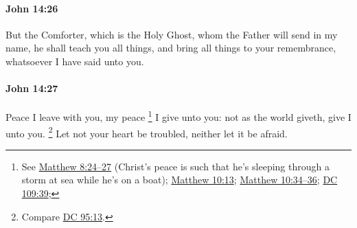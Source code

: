		\paragraph{John 14:26} %
			\label{JOHN-14-26}

			But the Comforter, which is the Holy Ghost, whom the Father will send in my name, he shall teach you all things, and bring all things to your remembrance, whatsoever I have said unto you.

			\begin{framed}
				\scriptsize
				\begin{compactdesc}
					\item[SBLG] 
				\end{compactdesc}
			\end{framed}

		\paragraph{John 14:27} %
			\label{JOHN-14-27}

			Peace I leave with you, my peace%
				\footnote{%
					See \hyperref[MATTHEW-8-24]{Matthew 8:24--27} (Christ's peace is such that he's sleeping through a storm at sea while he's on a boat); \hyperref[MATTHEW-10-13]{Matthew 10:13}; \hyperref[MATTHEW-10-34]{Matthew 10:34--36}; \hyperref[DC109-39]{DC 109:39}; 
					} 
			I give unto you: not as the world giveth, give I unto you.%
				\footnote{%
					Compare \hyperref[DC95-13]{DC 95:13}.
					}
			Let not your heart be troubled, neither let it be afraid.


